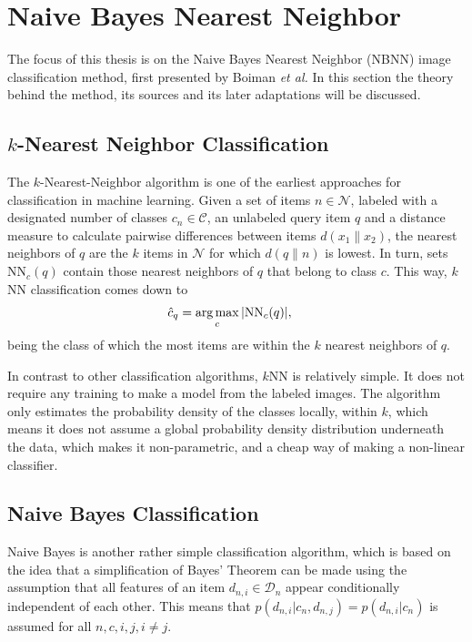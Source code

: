 \section{Naive Bayes Nearest Neighbor} %
\label{cha:naive_bayes_nearest_neighbor}

The focus of this thesis is on the Naive Bayes Nearest Neighbor (NBNN) image classification method, first presented by Boiman \emph{et al.} \cite{boiman2008defense} In this section the theory behind the method, its sources and its later adaptations will be discussed.

\subsection{$k$-Nearest Neighbor Classification} %
\label{sub:_k_nearest_neighbor}

The $k$-Nearest-Neighbor algorithm is one of the earliest approaches for classification in machine learning. Given a set of items $n \in \mathcal{N}$, labeled with a designated number of classes $c_n \in \mathcal{C}$, an unlabeled query item $q$ and a distance measure to calculate pairwise differences between items $d(x_1\|x_2)$, the nearest neighbors of $q$ are the $k$ items in $\mathcal{N}$ for which $d(q\|n)$ is lowest. In turn, sets $\text{NN}_c(q)$ contain those nearest neighbors of $q$ that belong to class $c$. This way, $k$NN classification comes down to
\begin{align}
    \hat c_q &= \operatorname*{arg\,max}_c |\text{NN}_c(q)|,
\end{align}
being the class of which the most items are within the $k$ nearest neighbors of $q$.

In contrast to other classification algorithms, $k$NN is relatively simple. It does not require any training to make a model from the labeled images. The algorithm only estimates the probability density of the classes locally, within $k$, which means it does not assume a global probability density distribution underneath the data, which makes it non-parametric, and a cheap way of making a non-linear classifier.

\subsection{Naive Bayes Classification} %
\label{sub:NB}

Naive Bayes is another rather simple classification algorithm, which is based on the idea that a simplification of Bayes' Theorem can be made using the assumption that all features of an item $d_{n,i} \in \mathcal{D}_n$ appear conditionally independent of each other. This means that $p(d_{n,i} | c_n, d_{n,j}) = p(d_{n,i}|c_n)$ is assumed for all $n,c,i,j, i\neq j$. 

